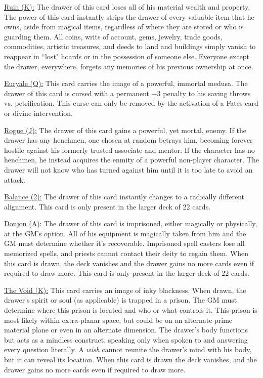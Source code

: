 \begin{multicols}{2}
\underline{Ruin (K):} The drawer of this card loses all of his material wealth and property.  The power of this card instantly strips the drawer of every valuable item that he owns, aside from magical items, regardless of where they are stored or who is guarding them.  All coins, writs of account, gems, jewelry, trade goods, commodities, artistic treasures, and deeds to land and buildings simply vanish to reappear in ``lost" hoards or in the possession of someone else.  Everyone except the drawer, everywhere, forgets any memories of his previous ownership at once.  

\underline{Euryale (Q):} This card carries the image of a powerful, immortal medusa.  The drawer of this card is cursed with a permanent $-3$ penalty to his saving throws vs. petrification.  This curse can only be removed by the activation of a Fates card or divine intervention.

\underline{Rogue (J):} The drawer of this card gains a powerful, yet mortal, enemy.  If the drawer has any henchmen, one chosen at random betrays him, becoming forever hostile against his formerly trusted associate and mentor.  If the character has no henchmen, he instead acquires the enmity of a powerful non-player character.  The drawer will not know who has turned against him until it is too late to avoid an attack.

\underline{Balance (2):} The drawer of this card instantly changes to a radically different alignment.  This card is only present in the larger deck of 22 cards.

\underline{Donjon (A):} The drawer of this card is imprisoned, either magically or physically, at the GM's option.  All of his equipment is magically taken from him and the GM must determine whether it's recoverable.  Imprisoned spell casters lose all memorized spells, and priests cannot contact their deity to regain them.  When this card is drawn, the deck vanishes and the drawer gains no more cards even if required to draw more.  This card is only present in the larger deck of 22 cards. 

\underline{The Void (K):} This card carries an image of inky blackness.  When drawn, the drawer's spirit or soul (as applicable) is trapped in a prison.  The GM must determine where this prison is located and who or what controls it.  This prison is most likely within extra-planar space, but could be on an alternate prime material plane or even in an alternate dimension.   The drawer's body functions but acts as a mindless construct, speaking only when spoken to and answering every question literally.  A \textit{wish} cannot reunite the drawer's mind with his body, but it can reveal its location.  When this card is drawn the deck vanishes, and the drawer gains no more cards even if required to draw more.


\end{multicols}
